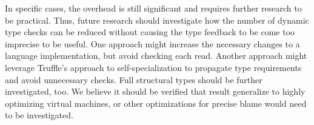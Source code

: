 In specific cases, the overhead is still significant and requires further
research to be practical. Thus, future research should investigate how the
number of dynamic type checks can be reduced without causing
the type feedback to be come too imprecise to be useful.
One approach might increase the necessary changes to a language implementation,
but avoid checking each read.
Another approach might leverage Truffle's approach to self-specialization
to propagate type requirements and avoid unnecessary checks.
Full structural types should be further investigated, too.
We believe it should be verified that \citet{Richards2017} result generalize
to highly optimizing virtual machines,
or other optimizations for precise blame would need to be investigated.

